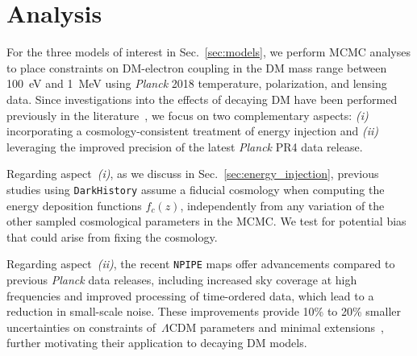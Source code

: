\documentclass[aps,prd,twocolumn,showpacs,superscriptaddress,nofootinbib,preprintnumbers]{revtex4-2}
\begin{document}
\section{Analysis}
\label{sec:analysis}

For the three models of interest in Sec.~\ref{sec:models}, we perform MCMC analyses to place constraints on DM-electron coupling in the DM mass range between 100~eV and 1~MeV using \textit{Planck} 2018 temperature, polarization, and lensing data.
Since investigations into the effects of decaying DM have been performed previously in the literature~\cite{Liu:2023nct, Capozzi:2023xie, 2024arXiv240813305X}, we focus on two complementary aspects: \textit{(i)} incorporating a cosmology-consistent treatment of energy injection and \textit{(ii)} leveraging the improved precision of the latest \textit{Planck} PR4 data release.

Regarding aspect~\textit{(i)}, as we discuss in Sec.~\ref{sec:energy_injection}, previous studies using \texttt{DarkHistory} assume a fiducial cosmology when computing the energy deposition functions $f_c(z)$, independently from any variation of the other sampled cosmological parameters in the MCMC. We test for potential bias that could arise from fixing the cosmology.


Regarding aspect~\textit{(ii)}, the recent \texttt{NPIPE} maps offer advancements compared to previous \textit{Planck} data releases, including increased sky coverage at high frequencies and improved processing of time-ordered data, which lead to a reduction in small-scale noise.
These improvements provide 10\% to 20\% smaller uncertainties on constraints of~$\Lambda$CDM parameters and minimal extensions~\cite{Tristram:2023haj}, further motivating their application to decaying DM models.
\end{document}
